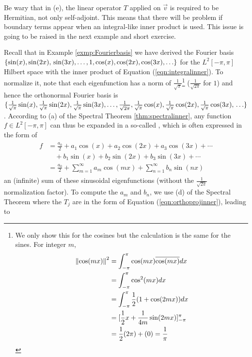 Be wary that in (e), the linear operator $T$ applied on $\vec{v}$ is required to be Hermitian, not only self-adjoint. This means that there will be problem if boundary terms appear when an integral-like inner product is used. This issue is going to be raised in the next example and short exercise.\par

Recall that in Example \ref{exmp:Fourierbasis} we have derived the Fourier basis $\{\sin(x), \sin(2x), \\ \sin(3x), \ldots, 1, \cos(x), \cos(2x), \cos(3x), \ldots\}$ for the $L^2[-\pi, \pi]$ Hilbert space with the inner product of Equation (\ref{eqn:integralinner}). To normalize it, note that each eigenfunction has a norm of $\frac{1}{\sqrt{\pi}}$\footnote{We only show this for the cosines but the calculation is the same for the sines. For integer $m$,
\begin{align*}
\norm{\cos(mx)}^2 &= \int_{-\pi}^{\pi} \cos(mx)\overline{\cos(mx)} dx \\
&= \int_{-\pi}^{\pi} \cos^2(mx) dx \\
&= \int_{-\pi}^{\pi} \frac{1}{2}(1 + \cos(2mx)) dx \\
&= [\frac{1}{2}x + \frac{1}{4m}\sin(2mx)]_{-\pi}^{\pi} \\
&= \frac{1}{2}(2\pi) + (0) = \frac{1}{\pi}
\end{align*}
} ($\frac{1}{\sqrt{2\pi}}$ for $1$) and hence the orthonormal Fourier basis is $\{\frac{1}{\sqrt{\pi}}\sin(x), \frac{1}{\sqrt{\pi}}\sin(2x), \frac{1}{\sqrt{\pi}}\sin(3x), \ldots, \frac{1}{\sqrt{2\pi}}, \frac{1}{\sqrt{\pi}}\cos(x), \frac{1}{\sqrt{\pi}}\cos(2x), \frac{1}{\sqrt{\pi}}\cos(3x), \\ \ldots\}$. According to (a) of the Spectral Theorem \ref{thm:spectralinner}, any function $f \in L^2[-\pi, \pi]$ can thus be expanded in a so-called , which is often expressed in the form of
\begin{align}
\begin{aligned}
f &= \frac{a_0}{2} + a_1\cos(x) + a_2\cos(2x) + a_3\cos(3x) + \cdots \\
&\quad + b_1\sin(x) + b_2\sin(2x) + b_3\sin(3x) + \cdots \\
&= \frac{a_0}{2} + \sum_{m=1}^{\infty} a_m \cos(mx) + \sum_{n=1}^{\infty} b_n \sin(nx) 
\end{aligned} \label{eqn:fourierseries}
\end{align}
an (infinite) sum of these sinusoidal eigenfunctions (without the $\frac{1}{\sqrt{2\pi}}$ normalization factor). To compute the  $a_m$ and $b_n$, we use (d) of the Spectral Theorem where the $T_j$ are in the form of Equation (\ref{eqn:orthoprojinner}), leading to
